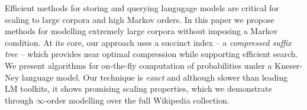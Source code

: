 Efficient methods for storing and querying langugage models are critical for scaling to large corpora and high Markov orders.
In this paper we propose methods for modelling extremely large corpora without
imposing a Markov condition.
At its core, our approach uses a succinct index -- a \emph{compressed suffix tree} -- which provides near optimal compression while supporting efficient search.
We present algorithms for on-the-fly computation of probabilities under a
Kneser-Ney language model.
Our technique is \emph{exact} and although slower than leading LM
toolkits, it shows promising scaling properties,
which we demonstrate through $\infty$-order modelling over the full Wikipedia collection. 


